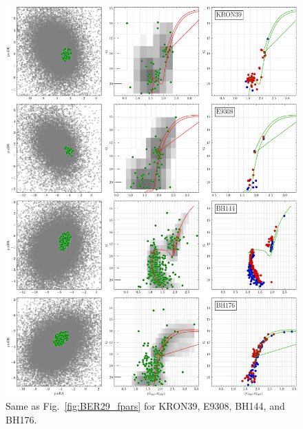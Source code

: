 \documentclass{aa}
\begin{document}
\begin{appendix}
 \begin{figure}
  \centering
  \includegraphics[height=.95\textheight]{figs/16_fpars.png}
  \caption{Same as Fig.~\ref{fig:BER29_fpars} for KRON39, E9308, BH144, and BH176.}
  \label{fig:16fpars}
 \end{figure}


\end{appendix}
\end{document}
